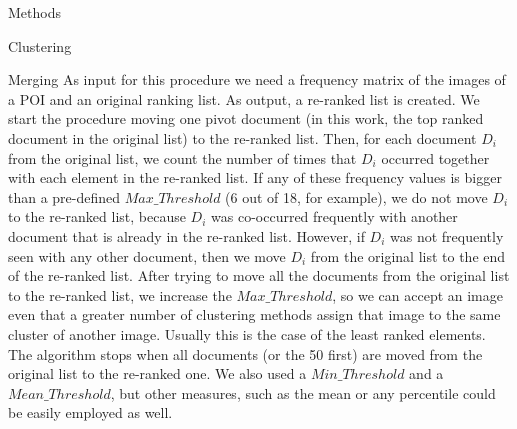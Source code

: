 \documentclass{acm_proc_article-me}
\begin{document}
\begin{section}{Methods}
\begin{subsection}{Clustering}
\begin{subsubsection}{Merging}
As input for this procedure we need a frequency matrix of the images of a POI and an original ranking list. 
As output, a re-ranked list is created.
We start the procedure moving one pivot document (in this work, the top ranked document in the original list) to the re-ranked list. Then, for each document $D_i$ from the original list, we count the number of times that $D_i$ occurred together with each element in the re-ranked list. 
If any of these frequency values is bigger than a pre-defined $Max\_Threshold$ (6 out of 18, for example), we do not move $D_i$ to the re-ranked list, because $D_i$ was co-occurred frequently with another document that is already in the re-ranked list. However, if $D_i$ was not frequently seen with any other document, then we move $D_i$ from the original list to the end of the re-ranked list.
After trying to move all the documents from the original list to the re-ranked list, we increase the $Max\_Threshold$, so we can accept an image even that a greater number of clustering methods assign that image to the same cluster of another image. Usually this is the case of the least ranked elements.
The algorithm stops when all documents (or the 50 first) are moved from the original list to the re-ranked one.
We also used a $Min\_Threshold$ and a $Mean\_Threshold$, but other measures, such as the mean or any percentile could be easily employed as well.



\end{subsubsection}
\end{subsection}
\end{section}
\end{document}
